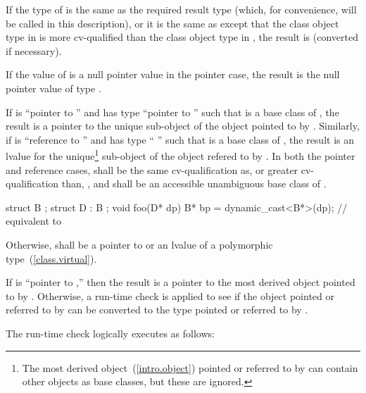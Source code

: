 \pnum
If the type of  is the same as the required result type (which,
for convenience, will be called  in this description), or it is
the same as  except that the class object type in  is
more cv-qualified than the class object type in , the result is
 (converted if necessary).

\pnum
If the value of  is a null pointer value in the pointer case,
the result is the null pointer value of type .

\pnum
If  is ``pointer to  '' and  has
type ``pointer to  '' such that  is a base
class of , the result is a pointer to the unique 
sub-object of the  object pointed to by . Similarly, if
 is ``reference to  '' and  has
type `` '' such that  is a base class of
, the result is an lvalue for the unique\footnote{The most derived object~(\ref{intro.object}) pointed or referred to by
 can contain other  objects as base classes, but these
are ignored.}  sub-object of the  object refered to by
. In both the pointer and reference cases,  shall be
the same cv-qualification as, or greater cv-qualification than,
, and  shall be an accessible unambiguous base class
of .
\enterexample 

\begin{codeblock}
struct B {};
struct D : B {};
void foo(D* dp)
{
    B*  bp = dynamic_cast<B*>(dp);	// equivalent to 
}
\end{codeblock}
\exitexampleb

\pnum
Otherwise,  shall be a pointer to or an lvalue of a polymorphic
type~(\ref{class.virtual}).

\pnum
If  is ``pointer to  ,'' then the result
is a pointer to the most derived object pointed to by .
Otherwise, a run-time check is applied to see if the object pointed or
referred to by  can be converted to the type pointed or
referred to by .

\pnum
The run-time check logically executes as follows:

